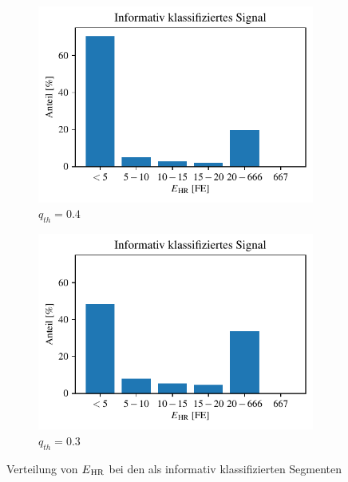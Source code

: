  
 \begin{figure}[H]
 	\centering
		\begin{subfigure}{.45\textwidth}
			\centering
 			\includegraphics[scale=0.7]{pic/brueser04-positives.pdf}
 			\caption[$q_{th}=0.4$]{$q_{th}=0.4$}
 		\end{subfigure}
    	\begin{subfigure}{.45\textwidth}
    		\centering
 			\includegraphics[scale=0.7]{pic/brueser03-positives.pdf}
 			\caption[$q_{th}=0.3$]{$q_{th}=0.3$}
 		\end{subfigure}
 	\caption[Verteilung von $E\textsubscript{HR}$ bei den als informativ klassifizierten Segmenten durch Betrachtung der Ähnlichkeit der \ac{CLIE}-Intervallschätzer]{Verteilung von $E\textsubscript{HR}$ bei den als informativ klassifizierten Segmenten}
 	\label{fig:brueser-positives}
 \end{figure}
 
